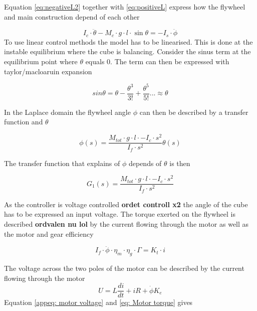 \documentclass[a4paper,11pt]{kth-mag}
\begin{document}
Equation \ref{eq:negativeL2} together with \ref{eq:positiveL} express how the flywheel and main construction depend of each other

\begin{equation}
I_c \cdot \ddot{\theta} - M_c \cdot g \cdot l \cdot \sin \theta   = -I_s \cdot \ddot{\phi}
\end{equation}
To use linear control methods the model has to be linearised. This is done at the instable equilibrium where the cube is balancing. Consider the sinus term at the equilibrium point where $\theta$ equals $0$. The term can then be expressed with taylor/macloaruin expansion

\begin{equation} \label{eq: sinus taylor}
sin \theta = \theta - \frac{\theta^3}{3!} +\frac{\theta^5}{5!}... \approx \theta 
\end{equation}

In the Laplace domain the flywheel angle $\phi$ can then be described by a transfer function and $\theta$

\begin{equation} \label{appeq: flywheelvscons}
\phi (s) = \frac{M_{tot} \cdot g \cdot l \cdot-I_c \cdot s^2}{I_f \cdot s^2}  \theta(s)
\end{equation}

The transfer function that explains of $\phi$ depends of $\theta$ is then

\begin{equation} \label{appeq: transferfunc1}
G_1(s) = \frac{M_{tot} \cdot g \cdot l \cdot-I_c \cdot s^2}{I_f \cdot s^2} 
\end{equation}

As the controller is voltage controlled \textbf{ordet controll x2} the angle of the cube has to be expressed an input voltage.
The torque exerted on the flywheel is described \textbf{ordvalen nu lol} by the current flowing through the motor as well as the motor and gear efficiency

\begin{equation}\label{eq: Motor torque}
I_f \cdot \ddot{\phi} \cdot \eta_m \cdot \eta_g \cdot \Gamma  = K_t \cdot i
\end{equation}

The voltage across the two poles of the motor can be described by the current flowing through the motor
\begin{equation} \label{appeq: motor voltage}
U = L\frac{di}{dt} + iR + \dot{\phi}K_e
\end{equation}
Equation \ref{appeq: motor voltage} and \ref{eq: Motor torque} gives 
\end{document}
